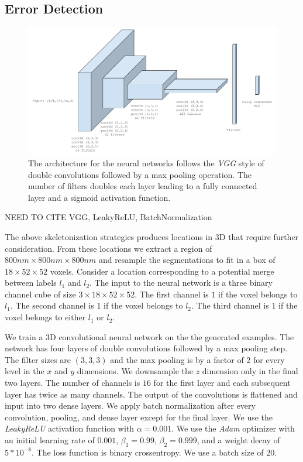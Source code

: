 \subsection{Error Detection}

\begin{figure}[t]
	\centering
	\includegraphics[width=0.8\linewidth]{figures/architecture.png}
	\caption{The architecture for the neural networks follows the \textit{VGG} style of double convolutions followed by a max pooling operation. The number of filters doubles each layer leading to a fully connected layer and a sigmoid activation function.}
	\label{fig:architecture}
\end{figure}

NEED TO CITE VGG, LeakyReLU, BatchNormalization

The above skeletonization strategies produces locations in 3D that require further consideration. From these locations we extract a region of $800nm \times 800nm \times 800nm$ and resample the segmentations to fit in a box of $18 \times 52 \times 52$ voxels. Consider a location corresponding to a potential merge between labels $l_1$ and $l_2$. The input to the neural network is a three binary channel cube of size $3 \times 18 \times 52 \times 52$. The first channel is $1$ if the voxel belongs to $l_1$. The second channel is 1 if the voxel belongs to $l_2$. The third channel is $1$ if the voxel belongs to either $l_1$ or $l_2$. 

We train a 3D convolutional neural network on the the generated examples. The network has four layers of double convolutions followed by a max pooling step. The filter sizes are $(3, 3, 3)$ and the max pooling is by a factor of $2$ for every level in the $x$ and $y$ dimensions. We downsample the $z$ dimension only in the final two layers. The number of channels is $16$ for the first layer and each subsequent layer has twice as many channels. The output of the convolutions is flattened and input into two dense layers. We apply batch normalization after every convolution, pooling, and dense layer except for the final layer. We use the \textit{LeakyReLU} activation function with $\alpha = 0.001$. We use the \textit{Adam} optimizer with an initial learning rate of $0.001$, $\beta_1 = 0.99$, $\beta_2 = 0.999$, and a weight decay of $5*10^{-8}$. The loss function is binary crossentropy. We use a batch size of 20.  

